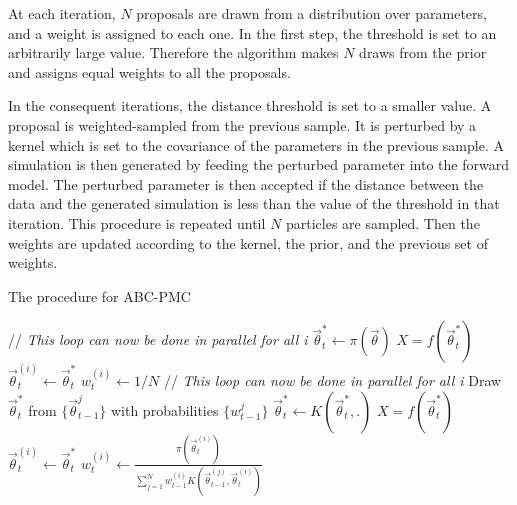 \documentclass[12pt, preprint]{aastex}
\newcommand{\pars}{\vec{\theta}}
\begin{document}
At each iteration, $N$ proposals are drawn from a distribution over parameters, and a weight is assigned to each one. In the first step, the threshold is set to an arbitrarily large value. Therefore the algorithm makes $N$ draws from the prior and assigns equal weights to all the proposals.

In the consequent iterations, the distance threshold is set to a smaller value. A proposal is weighted-sampled from the previous sample. It is perturbed by a kernel which is set to the covariance of the parameters in the previous sample. A simulation is then generated by feeding the perturbed parameter into the forward model. The perturbed parameter is then accepted if the distance between the data and the generated simulation is less than the value of the threshold in that iteration. This procedure is repeated until $N$ particles are sampled. Then the weights are updated according to the kernel, the prior, and the previous set of weights.

\begin{algorithm}
\caption{The procedure for ABC-PMC}
\begin{algorithmic}[1]
   \STATE // \emph{This loop can now be done in parallel for all i}
   \STATE $\pars^{*}_{t} \gets \pi(\pars)$
   \STATE $X = f(\pars^{*}_{t})$
   \ENDWHILE
   \STATE $\pars^{(i)}_{t} \gets \pars^{*}_{t}$
   \STATE $w^{(i)}_{t} \gets 1/N$
\ENDFOR
\ENDIF
{}
   \STATE // \emph{This loop can now be done in parallel for all i}
   \STATE Draw $\pars^{*}_{t}$ from $\{\pars^{j}_{t-1}\}$ with probabilities $\{w^{j}_{t-1}\}$
   \STATE $\pars^{*}_{t} \gets K(\pars^{*}_{t},.)$
   \STATE $X = f(\pars^{*}_{t})$
   \ENDWHILE
   \STATE $\pars^{(i)}_{t} \gets \pars^{*}_{t}$
   \STATE $w^{(i)}_{t} \gets \frac{\pi(\pars^{(i)}_{t})}{\sum_{j=1}^{N}w_{t-1}^{(i)}K(\pars^{(j)}_{t-1},\pars^{(i)}_{t})}$
\ENDFOR
\ENDIF
\end{algorithmic}
\end{algorithm}

\end{document}
